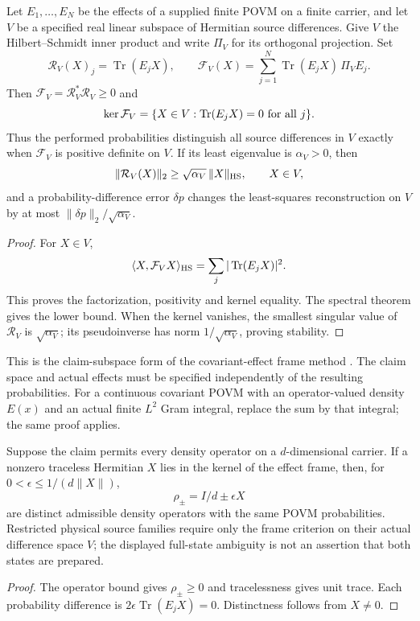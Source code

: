 \documentclass[12pt,a4paper]{article}
\begin{document}
\begin{theorem}
\label{p2c:thm:v2210-lit-effect-frame}
Let $E_1,\ldots,E_N$ be the effects of a supplied finite POVM on a finite
carrier, and let $V$ be a specified real linear subspace of Hermitian
source differences.  Give $V$ the Hilbert--Schmidt inner product and
write $\Pi_V$ for its orthogonal projection.  Set
\[
 \mathcal R_V(X)_j=\operatorname{Tr}(E_jX),\qquad
 \mathcal F_V(X)=\sum_{j=1}^N
       \operatorname{Tr}(E_jX)\,\Pi_VE_j.
\]
Then $\mathcal F_V=\mathcal R_V^*\mathcal R_V\ge0$ and
\[
 \ker\mathcal F_V=
 \{X\in V:\operatorname{Tr}(E_jX)=0\hbox{ for all }j\}.
\]
Thus the performed probabilities distinguish all source differences in
$V$ exactly when $\mathcal F_V$ is positive definite on $V$.
If its least eigenvalue is $\alpha_V>0$, then
\[
 \|\mathcal R_V(X)\|_2\ge\sqrt{\alpha_V}\,\|X\|_{\rm HS},
 \qquad X\in V,
\]
and a probability-difference error $\delta p$ changes the least-squares
reconstruction on $V$ by at most
$\|\delta p\|_2/\sqrt{\alpha_V}$.
\end{theorem}
\begin{proof}
For $X\in V$,
\[
 \langle X,\mathcal F_VX\rangle_{\rm HS}
 =\sum_j|\operatorname{Tr}(E_jX)|^2.
\]
This proves the factorization, positivity and kernel equality.  The
spectral theorem gives the lower bound.  When the kernel vanishes,
the smallest singular value of $\mathcal R_V$ is $\sqrt{\alpha_V}$;
its pseudoinverse has norm $1/\sqrt{\alpha_V}$, proving stability.
\end{proof}
This is the claim-subspace form of the covariant-effect frame method
\cite{LitGEODArPerSac2004Effects}.  The claim space and actual effects must
be specified independently of the resulting probabilities.  For a
continuous covariant POVM with an operator-valued density $E(x)$ and an
actual finite $L^2$ Gram integral, replace the sum by that integral;
the same proof applies.

\begin{corollary}
\label{p2c:cor:v2210-lit-state-ambiguity}
Suppose the claim permits every density operator on a $d$-dimensional
carrier.  If a nonzero traceless Hermitian $X$ lies in the kernel of the
effect frame, then, for
$0<\epsilon\le1/(d\|X\|)$,
\[
 \rho_\pm=I/d\pm\epsilon X
\]
are distinct admissible density operators with the same POVM
probabilities.  Restricted physical source families require only the
frame criterion on their actual difference space $V$; the displayed
full-state ambiguity is not an assertion that both states are prepared.
\end{corollary}
\begin{proof}
The operator bound gives $\rho_\pm\ge0$ and tracelessness gives unit
trace.  Each probability difference is
$2\epsilon\operatorname{Tr}(E_jX)=0$.  Distinctness follows from $X\ne0$.
\end{proof}
\end{document}
